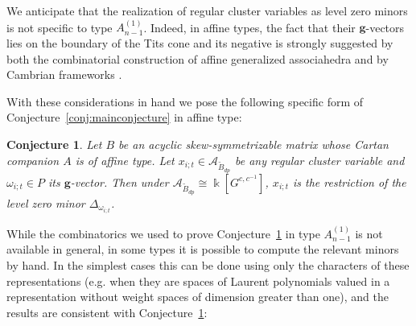 \documentclass[12pt]{amsart}
\newcommand{\cA}{\mathcal{A}}
\newcommand{\kk}{\Bbbk}
\newcommand{\bfg}{\mathbf{g}}
\newcommand{\gv}{\omega}
\newcommand{\Bdp}{\widetilde{B}_{dp}}
\newtheorem{conjecture}[theorem]{Conjecture}
\theoremstyle{remark}
\numberwithin{equation}{section}
\numberwithin{figure}{section}
\begin{document}
We anticipate that the realization of regular cluster variables as level zero minors is not specific to type $A_{n-1}^{\!(1)}$.
Indeed, in affine types, the fact that their $\bfg$-vectors lies on the boundary of the Tits cone and its negative is strongly suggested by both the combinatorial construction of affine generalized associahedra \cite{RS16} and by Cambrian frameworks \cite{RS15}.

With these considerations in hand we pose the following specific form of Conjecture~\ref{conj:mainconjecture} in affine type:

\begin{conjecture}
  \label{conj:affine}
  Let $B$ be an acyclic skew-symmetrizable matrix whose Cartan companion $A$ is of affine type.
  Let $x_{i;t} \in \cA_{\Bdp}$ be any regular cluster variable and $\gv_{i;t} \in P$ its $\bfg$-vector.
  Then under $\cA_{\Bdp} \cong \kk[G^{c,c^{-1}}]$, $x_{i;t}$ is the restriction of the level zero minor $\Delta_{\gv_{i;t}}$.
\end{conjecture}

While the combinatorics we used to prove Conjecture~\ref{conj:affine} in type $A_{n-1}^{\!(1)}$ is not available in general, in some types it is possible to compute the relevant minors by hand.
In the simplest cases this can be done using only the characters of these representations (e.g. when they are spaces of Laurent polynomials valued in a representation without weight spaces of dimension greater than one), and the results are consistent with Conjecture~\ref{conj:affine}:
\end{document}
